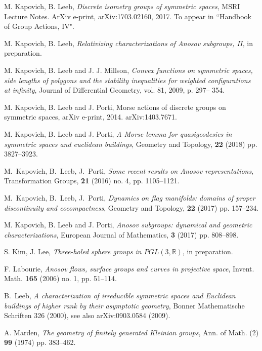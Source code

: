 \documentclass[12pt]{article}
\theoremstyle{boldplain}
\theoremstyle{bolddefinition}
\numberwithin{equation}{section}
\def\R{{\mathbb R}}
\begin{document}
\begin{thebibliography}{BLP05}
M. Kapovich, B. Leeb, 
{\em Discrete isometry groups of symmetric spaces}, 
MSRI Lecture Notes. ArXiv e-print, arXiv:1703.02160, 2017. 
To appear in ``Handbook of Group Actions, IV". 



M. Kapovich, B. Leeb, {\em Relativizing characterizations of Anosov subgroups, II,} in preparation.

 M. Kapovich, B. Leeb and J. J. Millson, {\em Convex functions on symmetric spaces, side lengths of polygons and the stability inequalities for weighted configurations at infinity},  
Journal of Differential Geometry,  vol. 81, 2009, p. 297-- 354. 


 M. Kapovich, B. Leeb and J. Porti, Morse actions of discrete groups on symmetric spaces, arXiv  e-print, 2014.  arXiv:1403.7671. 

M. Kapovich, B. Leeb and J. Porti, {\em A Morse lemma for quasigeodesics in symmetric spaces and euclidean buildings}, Geometry and Topology, {\bf 22} (2018) pp. 3827--3923.


M.\ Kapovich, B.\ Leeb, J.\ Porti, 
{\em Some recent results on Anosov representations}, Transformation Groups, {\bf 21} (2016) no. 4, pp. 1105--1121. 

M.\ Kapovich, B.\ Leeb, J.\ Porti,
{\em Dynamics on flag manifolds: domains of proper discontinuity and cocompactness},
Geometry and Topology, {\bf 22} (2017) pp. 157--234. 


 M. Kapovich, B. Leeb and J. Porti,  
{\em Anosov subgroups: dynamical and geometric characterizations}, European Journal of Mathematics, {\bf 3} (2017) pp. 808--898.


S. Kim, J. Lee, {\em Three-holed sphere groups in $PGL(3, \R)$}, in preparation. 

F. Labourie, {\em Anosov flows, surface groups and curves in projective space}, 
Invent. Math. {\bf 165} (2006) no. 1, pp. 51--114.

B.\ Leeb, 
{\em A characterization of irreducible symmetric spaces 
and Euclidean buildings of higher rank by their asymptotic geometry}, 
Bonner Mathematische Schriften 326 (2000), 
see also  arXiv:0903.0584 (2009).


A. Marden, {\em The geometry of finitely generated Kleinian groups}, Ann. of Math. (2) {\bf 99} (1974) pp. 383--462. 


\end{thebibliography}
\end{document}
